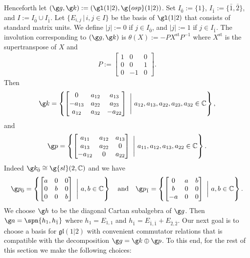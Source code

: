 \documentclass[11pt]{amsart}
\begin{document}
Henceforth let $(\g g,\g k):=(\gl(1|2),\g{osp}(1|2))$. Set $I_{\bar{0}}:=\{1\}$,  $I_{\bar{1}}:=\{\bar{1},\bar{2}\}$,
and $I:=I_{\bar 0}\cup I_{\bar 1}$.  Let $\{E_{i,j}\, |\, i,j\in I\}$ be the basis of $\gl(1|2)$ that consists of standard matrix units. We define  $|j|:=0$ if $j\in I_{\bar{0}} $, and $|j|:=1$ if $j\in I_{\bar{1}} $.
The involution corresponding to $(\g g,\g k)$ is $\theta(X):=-PX^\mathrm{st}P^{-1}$ where $X^\mathrm{st}$ is the supertranspose of $X$ and 
\begin{align*}
P:=\begin{bmatrix}
1&0&0\\
0&0&1\\
0&-1&0
\end{bmatrix}.
\end{align*}
Then
\begin{align*}
\g k=\left\lbrace\begin{bmatrix}
0&a_{12}&a_{13}\\
-a_{13}&a_{22}&a_{23}\\
a_{12}&a_{32}&-a_{22}
\end{bmatrix}\ \Bigg|\ 
a_{12},a_{13},a_{22},a_{23},a_{32}\in \mathbb{C}\right\rbrace,
\end{align*}
and
\begin{align*}
\g p=
\left\lbrace\begin{bmatrix}
a_{11}&a_{12}&a_{13}\\
a_{13}&a_{22}&0\\
-a_{12}&0&a_{22}
\end{bmatrix} \ \Bigg| \  a_{11},a_{12},a_{13},a_{22}\in \mathbb{C}\right\rbrace.
\end{align*}Indeed $\g k_{\bar{0}}\cong \g{sl}(2,\mathbb{C})$ and we have
\[
\g p_{\bar{0}}=\left\lbrace\begin{bmatrix}
a&0&0\\
0&b&0\\
0&0&b
\end{bmatrix} \ \Bigg| \ a,b\in \mathbb{C}\right\rbrace\quad\text{and}\quad \g p_{\bar{1}}=\left\lbrace\begin{bmatrix}
0&a&b\\
b&0&0\\
-a&0&0
\end{bmatrix} \ \bigg| \ a,b\in \mathbb{C}\right\rbrace.
\]
We choose $\g h$ to be the diagonal Cartan subalgebra of $\g g$. Then $\g a=\spn\{h_1,h_{\bar 1}\}$ where $h_1=E_{1,1}$ and $h_{\bar 1}=E_{\bar 1,\bar 1}+E_{\bar 2,\bar 2}$. 
Our next goal is to choose a basis for $\mathfrak{gl}(1|2)$ with convenient commutator relations that is compatible with the decomposition $\g g=\g k\oplus\g p$. To this end, for the rest of this section we make the following choices:
\end{document}
